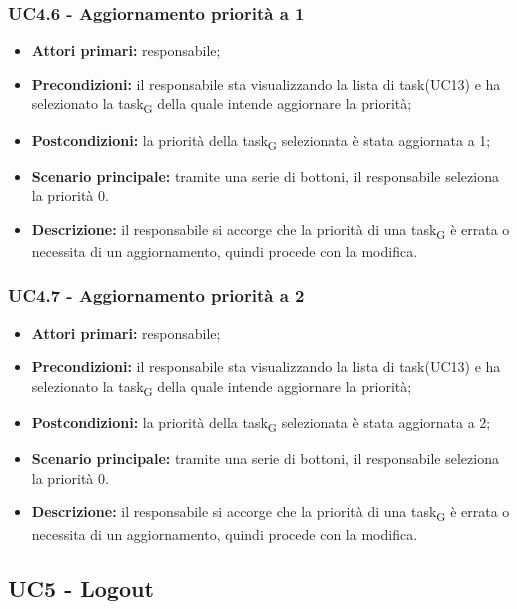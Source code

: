 \subsubsection{UC4.6 - Aggiornamento priorità a 1}
\begin{itemize}
	\item 	\textbf{Attori primari:} responsabile;
	\item 	\textbf{Precondizioni:} il responsabile sta visualizzando la lista di task(UC13) e ha selezionato la task\textsubscript{G} della quale intende aggiornare la priorità;
	\item 	\textbf{Postcondizioni:} la priorità della task\textsubscript{G} selezionata è stata aggiornata a 1;
	\item 	\textbf{Scenario principale:} tramite una serie di bottoni, il responsabile seleziona la priorità 0.
	\item 	\textbf{Descrizione:} il responsabile si accorge che la priorità di una task\textsubscript{G} è errata o necessita di un aggiornamento, quindi procede con la modifica.
\end{itemize}
\subsubsection{UC4.7 - Aggiornamento priorità a 2}
\begin{itemize}
	\item 	\textbf{Attori primari:} responsabile;
	\item 	\textbf{Precondizioni:} il responsabile sta visualizzando la lista di task(UC13) e ha selezionato la task\textsubscript{G} della quale intende aggiornare la priorità;
	\item 	\textbf{Postcondizioni:} la priorità della task\textsubscript{G} selezionata è stata aggiornata a 2;
	\item 	\textbf{Scenario principale:} tramite una serie di bottoni, il responsabile seleziona la priorità 0.
	\item 	\textbf{Descrizione:} il responsabile si accorge che la priorità di una task\textsubscript{G} è errata o necessita di un aggiornamento, quindi procede con la modifica.
\end{itemize}

\subsection{UC5 - Logout}

